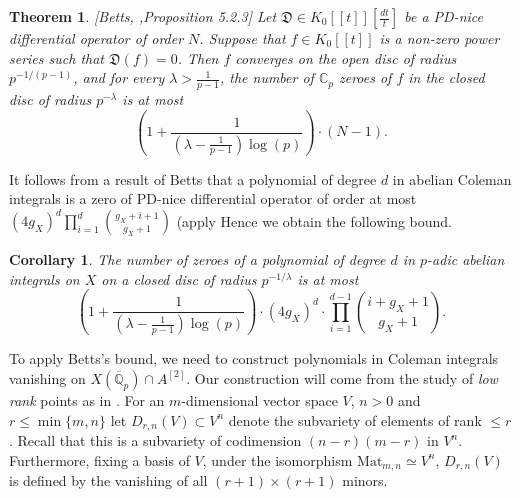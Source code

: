 \documentclass[11pt]{amsart}
\def\Q{\mathbb Q}
\newcommand{\dR}{\mathrm{dR}}
\newcommand{\gr}{\mathrm{gr}}
\theoremstyle{plain}
\newtheorem{theorem}{Theorem}
\newtheorem{corollary}{Corollary}
\theoremstyle{definition}
\newcommand{\Mat}{\mathrm{Mat}}
\begin{document}
\begin{theorem}\label{thm:betts}[Betts, \cite{betts:weight},Proposition 5.2.3]
Let $\mathfrak{D}\in K_0 [\! [t]\! ][\frac{dt}{t}]$ be a PD-nice differential operator of order $N$. Suppose that $f\in K_0 [\! [t]\! ]$ is a non-zero power series such that $\mathfrak{D}(f)=0$. Then $f$ converges on the open disc of radius $p^{-1/(p-1)}$, and for every $\lambda > \frac{1}{p-1}$, the number of $\mathbb{C}_p $ zeroes of $f$ in the closed disc of radius $p^{-\lambda }$ is at most
\[
\left( 1+\frac{1}{(\lambda -\frac{1}{p-1})\log (p)}\right) \cdot (N-1).
\]
\end{theorem}
It follows from a result of Betts that a polynomial of degree $d$ in abelian Coleman integrals is a zero of PD-nice differential operator of order at most $(4g_X )^d \prod _{i=1}^d \binom{g_X +i+1}{g_X +1 }$ (apply \cite[Proposition 5.3.1 and Example 1.2.4]{betts:weight}
%
%
Hence we obtain the following bound.
\begin{corollary}\label{cor:betts}
The number of zeroes of a polynomial of degree $d$ in $p$-adic abelian integrals on $X$ on a closed disc of radius $p^{-1/\lambda }$ is at most
\[
	\left( 1+\frac{1}{(\lambda -\frac{1}{p-1})\log (p)}\right)\cdot (4g_X )^d\cdot\prod_{i=1}^{d-1}\binom{i+g_X+1}{g_X +1}.
\]
\end{corollary}
To apply Betts's bound, we need to construct polynomials in Coleman integrals vanishing on $X(\overline{\Q }_p )\cap A^{[2]}$. Our construction will come from the study of \textit{low rank} points as in \cite{dogra}. For an $m$-dimensional vector space $V$, $n>0$ and $r\leq \min \{ m,n \}$ let $D_{r,n}(V)\subset V^n $ denote the subvariety of elements of rank $\leq r$. Recall that this is a subvariety of codimension $(n-r)(m-r)$ in $V^n$. Furthermore, fixing a basis of $V$, under the isomorphism $\Mat _{m,n} \simeq V^n$, $D_{r,n}(V)$ is defined by the vanishing of all $(r+1)\times (r+1)$ minors.
\end{document}
